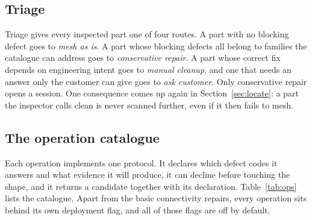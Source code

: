 \documentclass[11pt,onecolumn]{article}
\begin{document}
\subsection{Triage}
Triage gives every inspected part one of four routes. A part with no blocking defect goes to
\emph{mesh as is}. A part whose blocking defects all belong to families the catalogue can address
goes to \emph{conservative repair}. A part whose correct fix depends on engineering intent goes to
\emph{manual cleanup}, and one that needs an answer only the customer can give goes to \emph{ask
customer}. Only conservative repair opens a session. One consequence comes up again in
Section~\ref{sec:locate}: a part the inspector calls clean is never scanned further, even if it then
fails to mesh.

\subsection{The operation catalogue}
Each operation implements one protocol. It declares which defect codes it answers and what evidence
it will produce, it can decline before touching the shape, and it returns a candidate together with
its declaration. Table~\ref{tab:ops} lists the catalogue. Apart from the basic connectivity repairs,
every operation sits behind its own deployment flag, and all of those flags are off by default.
\end{document}

